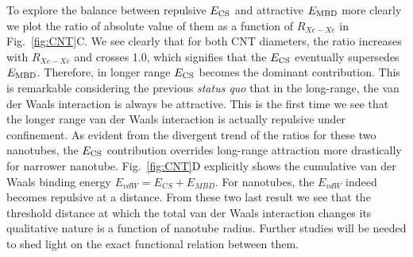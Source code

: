 \documentclass[aps,prl,groupaddress, twocolumn]{revtex4-1}  %
\begin{document}
To explore the balance between repulsive $E_{\rm CS}$ and attractive $E_{\rm MBD}$ more clearly we plot the ratio of absolute value of them as a function of $R_{Xe-Xe}$ in Fig.~\ref{fig:CNT}C. We see clearly that for both CNT diameters, the ratio increases with $R_{Xe-Xe}$ and crosses 1.0, which signifies that the $E_{\rm CS}$ eventually supersedes $E_{\rm MBD}$. Therefore, in longer range $E_{\rm CS}$ becomes the dominant contribution. This is remarkable considering the previous \textit{status quo} that in the long-range, the van der Waals interaction is always be attractive. This is the first time we see that the longer range van der Waals interaction is actually repulsive under confinement. As evident from the divergent trend of the ratios for these two nanotubes, the $E_{\rm CS}$ contribution overrides long-range attraction more drastically for narrower nanotube. Fig.~\ref{fig:CNT}D explicitly shows the cumulative van der Waals binding energy $E_{vdW} = E_{CS} + E_{MBD}$. For nanotubes, the $E_{vdW}$ indeed becomes repulsive at a distance. From these two last result we see that the threshold distance at which the total van der Waals interaction changes its qualitative nature is a function of nanotube radius. Further studies will be needed to shed light on the exact functional relation between them.
\end{document}
